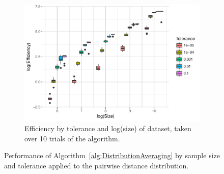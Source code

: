 \documentclass{article}
\begin{document}
\begin{figure}
\begin{subfigure}{0.49\textwidth}
        \includegraphics[width=\linewidth]{Figures/PairwiseDistance/efficiency_by_size_and_tol.pdf}
        \caption{Efficiency by tolerance and log(size) of dataset, taken over 10 trials of the algorithm.}
        \label{fig:PDEfficiencyBySize}
    \end{subfigure}
    \caption{Performance of Algorithm~\ref{alg:DistributionAveraging} by sample size and tolerance applied to the pairwise distance distribution.}
\end{figure}
\end{document}
